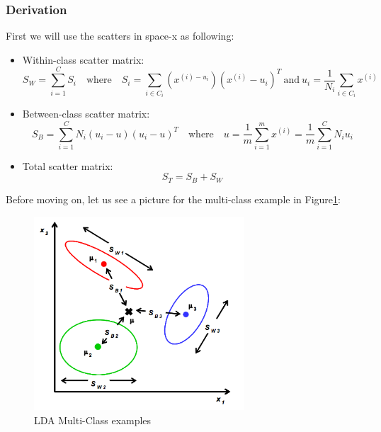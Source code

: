 \documentclass[a4paper]{article}
\begin{document}
\subsubsection{Derivation}
First we will use the scatters in space-x as following:
\begin{itemize}
	\item Within-class scatter matrix:
	$$
	S_W = \sum_{i=1}^{C}S_i \quad \text{where} \quad S_i = \sum_{i \in C_i}(x^{(i) - u_i})(x^{(i)} - u_i)^T \: \text{and} \: u_i = \frac{1}{N_i} \sum_{i \in C_i} x^{(i)}
	$$
	\item Between-class scatter matrix:
	$$
	S_B = \sum_{i=1}^{C}N_i (u_i - u)(u_i - u)^T \quad \text{where} \quad u = \frac{1}{m}\sum_{i=1}^{m}x^{(i)} = \frac{1}{m}\sum_{i=1}^{C}N_i u_i
	$$
	\item Total scatter matrix:
	$$
	S_T = S_B + S_W
	$$
\end{itemize}

Before moving on, let us see a picture for the multi-class example in Figure\ref{fig:multi}:

\begin {figure}
\centering
\includegraphics[width=0.7\textwidth]{./images/multi.png}
\caption{\label{fig:multi} LDA Multi-Class examples}
\end {figure}
\end{document}
